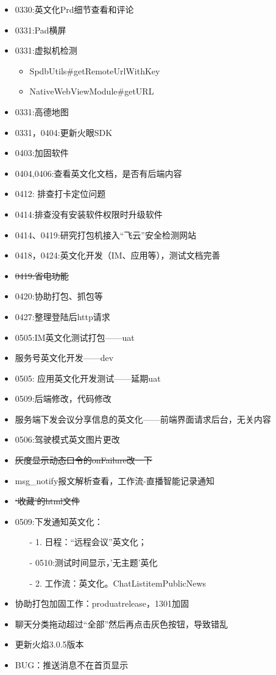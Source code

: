 \documentclass[12pt,a4paper]{ctexart}
\begin{document}
\begin{itemize}
		\item 0330:英文化Prd细节查看和评论
		\item 0331:Pad横屏
		\item 0331:虚拟机检测
		\begin{itemize}
			\item SpdbUtils\#getRemoteUrlWithKey
			\item NativeWebViewModule\#getURL
		\end{itemize}
		\item 0331:高德地图
		\item 0331，0404:更新火眼SDK
		\item 0403:加固软件
		\item 0404,0406:查看英文化文档，是否有后端内容
		\item 0412: 排查打卡定位问题
		\item 0414:排查没有安装软件权限时升级软件
		\item 0414、0419:研究打包机接入“飞云”安全检测网站
		\item 0418，0424:英文化开发（IM、应用等），测试文档完善
		\item \sout{0419:省电功能}
		\item 0420:协助打包、抓包等
		\item 0427:整理登陆后http请求
		\item 0505:IM英文化测试打包——uat
		\item 服务号英文化开发——dev
		\item 0505: 应用英文化开发测试——延期uat
		\item 0509:后端修改，代码修改
		\item 服务端下发会议分享信息的英文化——前端界面请求后台，无关内容
		\item 0506:驾驶模式英文图片更改
		\item \sout{灰度显示动态口令的onFailure改一下}
		\item msg\_notify报文解析查看，工作流-直播\/智能记录通知
		\item \sout{‘收藏’的html文件}
		\item 0509:下发通知英文化：
		\begin{itemize}
			\item[-] 1. 日程：“远程会议”英文化；
			\item[-] 0510:测试时间显示，’无主题’英化
			\item[-]  2. 工作流：英文化。ChatListitemPublicNews
		\end{itemize}
		\item 协助打包加固工作：produatrelease，1301加固
		\item 聊天分类拖动超过“全部”然后再点击灰色按钮，导致错乱
		\item 更新火焰3.0.5版本
		\item BUG：推送消息不在首页显示
		\newline
	\end{itemize}
\end{document}

